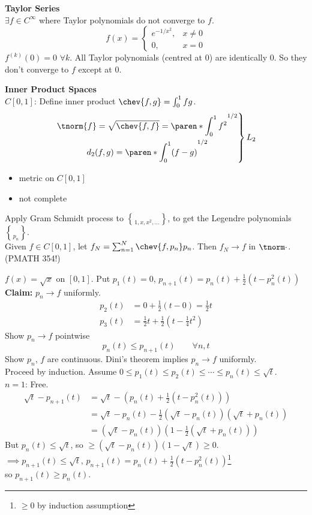\textbf{Taylor Series} \\
$\exists f\in C^\infty$ where Taylor polynomials do not converge to $f$.
\[ f(x) = \begin{cases}
e^{-1/x^2}, & x \neq 0 \\
0, & x = 0
\end{cases} \]
$f^{(k)}(0)=0$ $\forall k$.  All Taylor polynomials (centred at 0) are identically 0.  So they don't converge to $f$ except at 0.

\textbf{Inner Product Spaces} \\
$C[0,1]$: Define inner product $\chev{f,g}=\int_0^1fg$.
\[ \left. \begin{gathered}
\tnorm{f} = \sqrt{\chev{f,f}} = \paren*{\int_0^1 f^2}^{1/2} \\
d_2(f,g) = \paren*{\int_0^1(f-g)}^{1/2}
\end{gathered} \right\} L_2 \]
\begin{itemize}
\item metric on $C[0,1]$
\item not complete
\end{itemize}
Apply Gram Schmidt process to $\brace{1,x,x^2,\dotsc}$, to get the Legendre polynomials $\brace{p_n}$. \\
Given $f\in C[0,1]$, let $f_N = \sum_{n=1}^N \chev{f,p_n}p_n$.  Then $f_N\to f$ in $\tnorm\cdot$. (PMATH 354!)

\ex $f(x)=\sqrt x$ on $[0,1]$.  Put $p_1(t)=0$, $p_{n+1}(t)=p_n(t)+\frac12(t-p_n^2(t))$ \\
\textbf{Claim: }$p_n\to f$ uniformly.
\begin{align*}
p_2(t) &= 0 + \tfrac12(t-0) = \tfrac12t \\
p_3(t) &= \tfrac12t + \tfrac12(t-\tfrac14t^2)
\end{align*}
Show $p_n\to f$ pointwise
\[ p_n(t) \leq p_{n+1}(t) \qquad \forall n,t \]
Show $p_n$, $f$ are continuous.  Dini's theorem implies $p_n\to f$ uniformly. \\
Proceed by induction.  Assume $0\leq p_1(t)\leq p_2(t)\leq \dotsb \leq p_n(t)\leq\sqrt t$. \\
$n=1$: Free.
\begin{align*}
\sqrt t - p_{n+1}(t) &= \sqrt t - (p_n(t)+\tfrac12(t-p_n^2(t))) \\
&= \sqrt t - p_n(t) - \tfrac12(\sqrt t-p_n(t))(\sqrt t+p_n(t)) \\
&= (\sqrt t-p_n(t))(1-\tfrac12(\sqrt t + p_n(t)))
\end{align*}
But $p_n(t)\leq\sqrt t$, so $\geq(\sqrt t-p_n(t))(1-\sqrt t)\geq0$. \\
$\implies p_{n+1}(t)\leq\sqrt t$, $p_{n+1}(t)=p_n(t)+\tfrac12(t-p_n^2(t))$\footnote{$\geq0$ by induction assumption} \\
so $p_{n+1}(t)\geq p_n(t)$.

